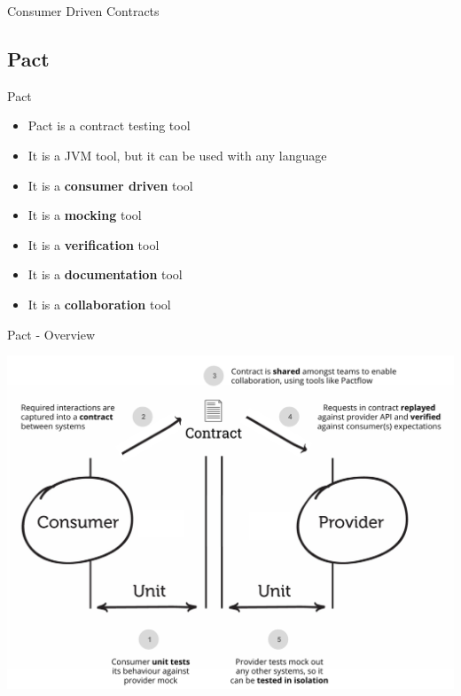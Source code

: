 \begin{frame}{Consumer Driven Contracts}
{\begin{center}
    \end{center}
    }

\end{frame}


\subsection{Pact}

\begin{frame}{Pact}
    \begin{itemize}
        \item Pact is a contract testing tool
        \item It is a JVM tool, but it can be used with any language
        \item It is a \textbf{consumer driven} tool
        \item It is a \textbf{mocking} tool
        \item It is a \textbf{verification} tool
        \item It is a \textbf{documentation} tool
        \item It is a \textbf{collaboration} tool
        \end{itemize}
\end{frame}

\begin{frame}{Pact - Overview}
    \begin{center}
        \includegraphics[width=.8\textwidth]{./assets/pact_overview}
    \end{center}
\end{frame}
